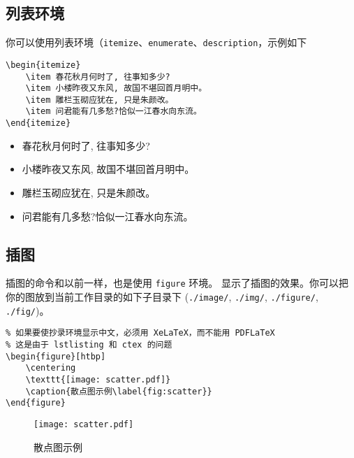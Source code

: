 \documentclass[lang=cn]{elegantpaper}
\begin{document}
\subsection{列表环境}
你可以使用列表环境（\lstinline{itemize}、\lstinline{enumerate}、\lstinline{description}，示例如下\\[2ex]
\begin{minipage}[c]{0.51\linewidth}
\begin{lstlisting}
\begin{itemize}
	\item 春花秋月何时了, 往事知多少? 
	\item 小楼昨夜又东风, 故国不堪回首月明中。
	\item 雕栏玉砌应犹在, 只是朱颜改。
	\item 问君能有几多愁?恰似一江春水向东流。
\end{itemize}
\end{lstlisting}
\end{minipage}
\begin{minipage}[c]{0.48\linewidth}
\begin{itemize}
	\item 春花秋月何时了, 往事知多少? 
	\item 小楼昨夜又东风, 故国不堪回首月明中。
	\item 雕栏玉砌应犹在, 只是朱颜改。
	\item 问君能有几多愁?恰似一江春水向东流。
\end{itemize}
\end{minipage}




\subsection{插图}
插图的命令和以前一样，也是使用 \lstinline{figure} 环境。 显示了插图的效果。你可以把你的图放到当前工作目录的如下子目录下 (\lstinline{./image/}, \lstinline{./img/}, \lstinline{./figure/}, \lstinline{./fig/})。

\begin{lstlisting}
% 如果要使抄录环境显示中文，必须用 XeLaTeX，而不能用 PDFLaTeX
% 这是由于 lstlisting 和 ctex 的问题
\begin{figure}[htbp]
	\centering
	\texttt{[image: scatter.pdf]}
	\caption{散点图示例\label{fig:scatter}} 
\end{figure}
\end{lstlisting}

\begin{figure}[htbp]
	\centering
	\texttt{[image: scatter.pdf]}
	\caption{散点图示例\label{fig:scatter}}
\end{figure}
\end{document}
